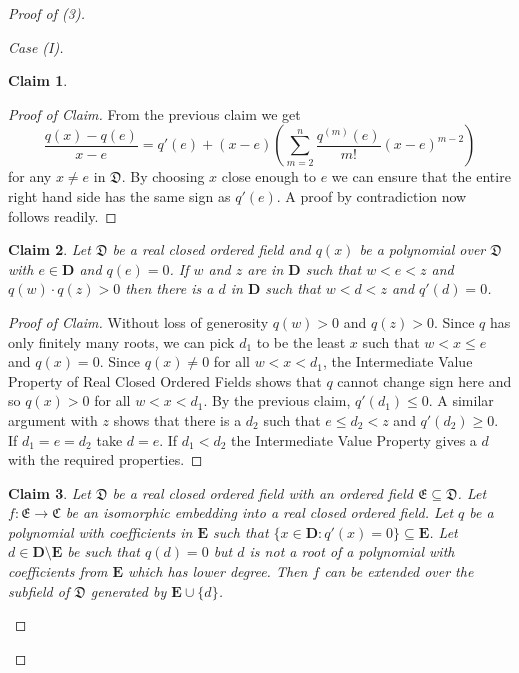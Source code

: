 \documentclass[titlepage, oneside]{amsbook}
\theoremstyle{plain}
\newtheorem*{claim}{Claim}
\theoremstyle{definition}
\theoremstyle{remark}
\newcommand{\seq}{\ensuremath{\subseteq}}
\newcommand{\mc}{\ensuremath{\mathfrak{C}}}
\newcommand{\md}{\ensuremath{\mathfrak{D}}}
\newcommand{\me}{\ensuremath{\mathfrak{E}}}
\newcommand{\bd}{\ensuremath{\mathbf{D}}}
\newcommand{\be}{\ensuremath{\mathbf{E}}}
\begin{document}
\begin{proof}[Proof of (3)]
\begin{proof}[Case (I)]
\begin{claim}
\end{claim}

\begin{proof}[Proof of Claim] From the previous claim we get 
\[ \frac{q(x) - q(e)}{x-e}  = q'(e) + (x - e) \left( \sum_{m=2}^n
\frac{q^{(m)}(e)}{m!} (x-e)^{m-2} \right) \]
for any $x \neq e$ in $\md$.  By choosing $x$ close enough to $e$ we
can ensure that the entire right hand side has the same sign as
$q'(e)$.  A proof by contradiction now follows readily.

\renewcommand{\qedsymbol}{}
\end{proof}

\begin{claim}  Let $\md$ be a real closed ordered field and $q(x)$ be 
a polynomial over $\md$ with $e \in \bd$ and $q (e) = 0$.  If $w$
and $z$ are in $\bd$ such that $w < e < z$ and $q(w) \cdot q (z) >
0$ then there is a $d$ in $\bd$ such that $w < d < z$ and $q' (d)
=0$.
\end{claim}

\begin{proof}[Proof of Claim]  Without loss of generosity $q (w) >
0$ and $q(z) > 0$. Since $q$ has only finitely many roots, we can
pick $d_1$ to be the least $x$ such that $w < x \leq e$ and $q (x)
=0$.  Since $q(x) \neq 0$ for all $w < x < d_1$, the Intermediate
Value Property of Real Closed Ordered Fields shows that $q$ cannot
change sign here and so $q(x) > 0$ for all $w < x < d_1$.  By the
previous claim, $q'(d_1) \leq 0$.  A similar argument with $z$ shows
that there is a $d_2$ such that $e \leq d_2 < z$ and $q' (d_2) \geq
0$.  If $d_1 = e = d_2$ take $d =e$.  If $d_1 < d_2$ the
Intermediate Value Property gives a $d$ with the required
properties.

\renewcommand{\qedsymbol}{}
\end{proof}

\begin{claim} Let $\md$ be a real closed ordered field with an
ordered field $\me \seq \md$.  Let $f: \me \to \mc$ be an isomorphic
embedding into a real closed ordered field.  Let $q$ be a polynomial
with coefficients in $\be$ such that $\{ x \in \bd : q' (x) = 0 \}
\seq \be$.  Let $d \in \bd \setminus \be$ be such that $q(d) =0$ but
$d$ is not a root of a polynomial with coefficients from $\be$ which
has lower degree.  Then $f$ can be extended over  the
subfield of $\md$ generated by $\be \cup \{ d\}$.

\end{claim}


\end{proof}
\end{proof}
\end{document}
